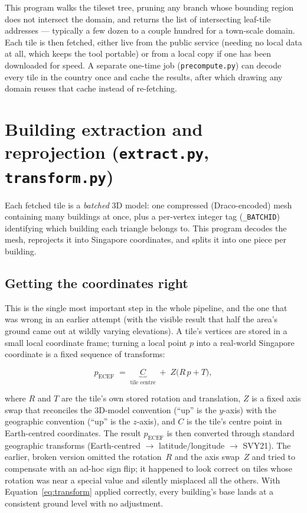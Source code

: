 \documentclass[11pt]{article}
\newcommand{\code}[1]{\texttt{#1}}
\begin{document}
This program walks the tileset tree, pruning any branch whose bounding region does not intersect
the domain, and returns the list of intersecting leaf-tile addresses --- typically a few dozen
to a couple hundred for a town-scale domain. Each tile is then fetched, either live from the
public service (needing no local data at all, which keeps the tool portable) or from a local
copy if one has been downloaded for speed. A separate one-time job (\code{precompute.py}) can
decode every tile in the country once and cache the results, after which drawing any domain
reuses that cache instead of re-fetching.

\section{Building extraction and reprojection (\code{extract.py}, \code{transform.py})}
\label{sec:extract}

Each fetched tile is a \emph{batched} 3D model: one compressed (Draco-encoded) mesh containing
many buildings at once, plus a per-vertex integer tag (\code{\_BATCHID}) identifying which
building each triangle belongs to. This program decodes the mesh, reprojects it into Singapore
coordinates, and splits it into one piece per building.

\subsection{Getting the coordinates right}

This is the single most important step in the whole pipeline, and the one that was wrong in an
earlier attempt (with the visible result that half the area's ground came out at wildly varying
elevations). A tile's vertices are stored in a small local coordinate frame; turning a local
point $p$ into a real-world Singapore coordinate is a fixed sequence of transforms:

\begin{equation}
  p_{\text{ECEF}} \;=\; \underbrace{C}_{\text{tile centre}} \;+\; Z\big(R\,p + T\big),
  \label{eq:transform}
\end{equation}

where $R$ and $T$ are the tile's own stored rotation and translation, $Z$ is a fixed axis swap
that reconciles the 3D-model convention (``up'' is the $y$-axis) with the geographic convention
(``up'' is the $z$-axis), and $C$ is the tile's centre point in Earth-centred coordinates. The
result $p_{\text{ECEF}}$ is then converted through standard geographic transforms
(Earth-centred $\to$ latitude/longitude $\to$ SVY21). The earlier, broken version omitted the
rotation~$R$ and the axis swap~$Z$ and tried to compensate with an ad-hoc sign flip; it happened
to look correct on tiles whose rotation was near a special value and silently misplaced all the
others. With Equation~\ref{eq:transform} applied correctly, every building's base lands at a
consistent ground level with no adjustment.
\end{document}
